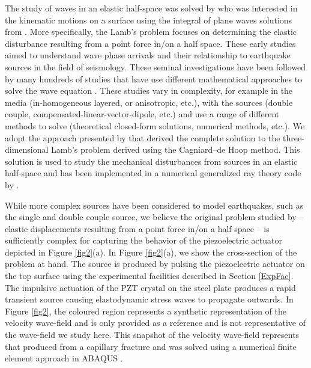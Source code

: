\documentclass[preprint,3p, 11pt,authoryear]{elsarticle}
\begin{document}
The study of waves in an elastic half-space was solved by \citet{Lamb1904} who was interested in the kinematic motions on a surface using the integral of plane waves solutions from \citet{Rayleigh1885}. More specifically, the Lamb's problem focuses on determining the elastic disturbance resulting from a point force in/on a half space. These early studies aimed to understand wave phase arrivals and their relationship to earthquake sources in the field of seismology. These seminal investigations have been followed by many hundreds of studies that have use different mathematical approaches to solve the wave equation \citep[e.g. ch 6 in][]{Aki2002}. These studies vary in complexity, for example in the media (in-homogeneous layered, or anisotropic, etc.), with the sources (double couple, compensated-linear-vector-dipole, etc.) and use a range of different methods to solve (theoretical closed-form solutions, numerical methods, etc.). We adopt the approach presented by \citet{Johnson1974} that derived the complete solution to the three-dimensional Lamb’s problem derived using the Cagniard--de Hoop method. This solution is used to study the mechanical disturbances from sources in an elastic half-space and has been implemented in a numerical generalized ray theory code by \citet{Hsu1985} \citep[see also][]{McLaskey2011, McLaskey2012, Selvadurai2019}.

While more complex sources have been considered to model earthquakes, such as the single and double couple source, we believe the original problem studied by \citet{Lamb1904} -- elastic displacements resulting from a point force in/on a half space -- is sufficiently complex for capturing the behavior of the piezoelectric actuator depicted in Figure \ref{fig2}(a). In Figure \ref{fig2}(a), we show the cross-section of the problem at hand. The source is produced by pulsing the piezoelectric actuator on the top surface using the experimental facilities described in Section \ref{ExpFac}. The impulsive actuation of the PZT crystal on the steel plate produces a rapid transient source causing elastodynamic stress waves to propagate outwards. In Figure \ref{fig2}, the coloured region represents a synthetic representation of the velocity wave-field and is only provided as a reference and is not representative of the wave-field we study here. This snapshot of the velocity wave-field represents that produced from a capillary fracture and was solved using a numerical finite element approach in ABAQUS \citep[adapted from fig. 2][]{Selvadurai2019}. 
\end{document}
